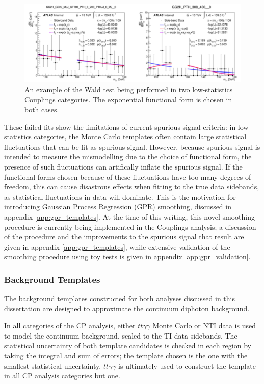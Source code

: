 \begin{figure}
\includegraphics[width=\linewidth]{figures/sigbkgparam/Walds.png}
\caption{An example of the Wald test being performed in two low-statistics Couplings categories. The exponential functional form is chosen in both cases.}
\label{fig:WaldTest}
\end{figure} 

These failed fits show the limitations of current spurious signal criteria: in low-statistics categories, the Monte Carlo templates often contain large statistical fluctuations that can be fit as spurious signal. However, because spurious signal is intended to measure the mismodelling due to the choice of functional form, the presence of such fluctuations can artifically inflate the spurious signal. If the functional forms chosen because of these fluctuations have too many degrees of freedom, this can cause disastrous effects when fitting to the true data sidebands, as statistical fluctuations in data will dominate. This is the motivation for introducing Gaussian Process Regression (GPR) smoothing, discussed in appendix \ref{app:gpr_templates}. At the time of this writing, this novel smoothing procedure is currently being implemented in the Couplings analysis; a discussion of the procedure and the improvements to the spurious signal that result are given in appendix \ref{app:gpr_templates}, while extensive validation of the smoothing procedure using toy tests is given in appendix \ref{app:gpr_validation}.

\subsubsection{Background Templates} \label{sec:bkgtemplates} 

The background templates constructed for both analyses discussed in this dissertation are designed to approximate the continuum diphoton background. 

In all categories of the CP analysis, either $tt\gamma\gamma$ Monte Carlo or NTI data is used to model the continuum background, scaled to the TI data sidebands. The statistical uncertainty of both template candidates is checked in each region by taking the integral and sum of errors; the template chosen is the one with the smallest statistical uncertainty. $tt\gamma\gamma$ is ultimately used to construct the template in all CP analysis categories but one. 

